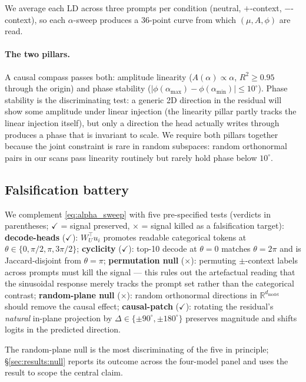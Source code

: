 We average each $\mathrm{LD}$ across three prompts per condition
(neutral, $+$-context, $-$-context), so each $\alpha$-sweep produces
a 36-point curve from which $(\mu, A, \phi)$ are read.

\paragraph{The two pillars.}
A causal compass passes both: amplitude linearity ($A(\alpha)
\propto \alpha$, $R^2 \geq 0.95$ through the origin) and phase
stability ($|\phi(\alpha_{\max}) - \phi(\alpha_{\min})| \leq 10^\circ$).
Phase stability is the discriminating test: a generic 2D direction
in the residual will show some amplitude under linear injection
(the linearity pillar partly tracks the linear injection itself),
but only a direction the head actually writes through produces a
phase that is invariant to scale. We require both pillars together
because the joint constraint is rare in random subspaces: random
orthonormal pairs in our scans pass linearity routinely but rarely
hold phase below $10^\circ$.

\subsection{Falsification battery}
\label{sec:method:battery}

We complement \cref{eq:alpha_sweep} with five pre-specified tests
(verdicts in parentheses; $\checkmark$ = signal preserved,
$\times$ = signal killed as a falsification target):
\textbf{decode-heads} ($\checkmark$): $W_U^\top u_i$ promotes
readable categorical tokens at $\theta \in \{0, \pi/2, \pi,
3\pi/2\}$;
\textbf{cyclicity} ($\checkmark$): top-10 decode at $\theta = 0$
matches $\theta = 2\pi$ and is Jaccard-disjoint from $\theta = \pi$;
\textbf{permutation null} ($\times$): permuting $\pm$-context labels
across prompts must kill the signal --- this rules out the
artefactual reading that the sinusoidal response merely tracks the
prompt set rather than the categorical contrast;
\textbf{random-plane null} ($\times$): random orthonormal directions
in $\mathbb{R}^{d_{\text{model}}}$ should remove the causal effect;
\textbf{causal-patch} ($\checkmark$): rotating the residual's
\emph{natural} in-plane projection by $\Delta \in \{\pm 90^\circ,
\pm 180^\circ\}$ preserves magnitude and shifts logits in the
predicted direction.

The random-plane null is the most discriminating of the five in
principle; \S\ref{sec:results:null} reports its outcome across the
four-model panel and uses the result to scope the central claim.

